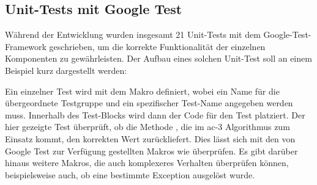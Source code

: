 \subsection{Unit-Tests mit Google Test}
Während der Entwicklung wurden insgesamt 21 Unit-Tests mit dem Google-Test-Framework geschrieben, um die korrekte Funktionalität der einzelnen Komponenten zu gewährleisten.
Der Aufbau eines solchen Unit-Test soll an einem Beispiel kurz dargestellt werden:

Ein einzelner Test wird mit dem Makro  definiert, wobei ein Name für die übergeordnete Testgruppe und ein spezifischer Test-Name angegeben werden muss. Innerhalb des
Test-Blocks wird dann der Code für den Test platziert. Der hier gezeigte Test überprüft, ob die Methode , die im \ac*{ac}-3 Algorithmus zum Einsatz
kommt, den korrekten Wert zurückliefert. Dies lässt sich mit den von Google Test zur Verfügung gestellten Makros wie  überprüfen. Es gibt darüber hinaus
weitere Makros, die auch komplexeres Verhalten überprüfen können, beispielsweise auch, ob eine bestimmte Exception ausgelöst wurde.
